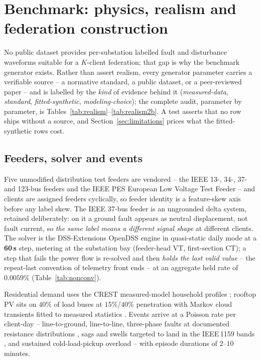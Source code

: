 \section{Benchmark: physics, realism and federation construction}
\label{sec:testbed}

No public dataset provides per-substation labelled fault and disturbance
waveforms suitable for a $K$-client federation; that gap is why the
benchmark generator exists. Rather than assert realism, every generator
parameter carries a verifiable source -- a normative standard, a public
dataset, or a peer-reviewed paper -- and is labelled by the \emph{kind}
of evidence behind it (\emph{measured-data}, \emph{standard},
\emph{fitted-synthetic}, \emph{modeling-choice}); the complete audit,
parameter by parameter, is Tables~\ref{tab:realism}--\ref{tab:realism2b}.
A test asserts that no row ships without a source, and
Section~\ref{sec:limitations} prices what the fitted-synthetic rows cost.

\subsection{Feeders, solver and events}

Five unmodified distribution test feeders are vendored -- the IEEE 13-,
34-, 37- and 123-bus feeders and the IEEE PES European Low Voltage Test
Feeder \cite{kersting2001} -- and clients are assigned feeders
cyclically, so feeder identity is a feature-skew axis before any label
skew. The IEEE 37-bus feeder is an ungrounded delta system, retained
deliberately: on it a ground fault appears as neutral displacement, not
fault current, so \emph{the same label means a different signal shape} at
different clients. The solver is the DSS-Extensions OpenDSS engine in
quasi-static daily mode at a \textbf{60\,s} step, metering at the
substation bay (feeder-head VT, first-section CT); a step that fails the
power flow is re-solved and then \emph{holds the last valid value} -- the
repeat-last convention of telemetry front ends -- at an aggregate held
rate of $0.0059\%$ (Table~\ref{tab:nonconv}).

Residential demand uses the CREST measured-model household profiles
\cite{richardson2010}; rooftop PV sits on $40\%$ of load buses at
$15\%$/$40\%$ penetration with Markov cloud transients fitted to measured
statistics \cite{hoke2013,woyte2007,lave2013}. Events arrive at a Poisson
rate per client-day -- line-to-ground, line-to-line, three-phase faults
at documented resistance distributions \cite{dagenhart2000,deandrade2010},
sags and swells targeted to land in the IEEE\,1159 bands
\cite{ieee1159,bollen2000}, and sustained cold-load-pickup overload
\cite{short2004} -- with episode durations of $2$--$10$ minutes.

